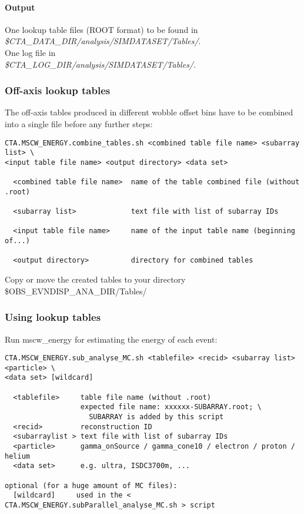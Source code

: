 \documentclass[titlepage,a4paper,twoside,11pt]{report}
\begin{document}
\paragraph{Output}

One lookup table files (ROOT format) to be found in \\
{\it \$CTA\_DATA\_DIR/analysis/SIMDATASET/Tables/}. \\
One log file in \\
{\it \$CTA\_LOG\_DIR/analysis/SIMDATASET/Tables/}.

\subsubsection{Off-axis lookup tables}

The off-axis tables produced in different wobble offset bins have to be combined into a single file before any further steps:

\begin{lstlisting}
CTA.MSCW_ENERGY.combine_tables.sh <combined table file name> <subarray list> \
<input table file name> <output directory> <data set> 

  <combined table file name>  name of the table combined file (without .root)

  <subarray list>             text file with list of subarray IDs

  <input table file name>     name of the input table name (beginning of...)

  <output directory>          directory for combined tables
\end{lstlisting}

Copy or move the created tables to your directory 
\$OBS\_EVNDISP\_ANA\_DIR/Tables/

\subsubsection{Using lookup tables}

Run mscw\_energy for estimating the energy of each
event: 

\begin{lstlisting}
CTA.MSCW_ENERGY.sub_analyse_MC.sh <tablefile> <recid> <subarray list> <particle> \
<data set> [wildcard]

  <tablefile>     table file name (without .root)
                  expected file name: xxxxxx-SUBARRAY.root; \
                    SUBARRAY is added by this script
  <recid>         reconstruction ID
  <subarraylist > text file with list of subarray IDs
  <particle>      gamma_onSource / gamma_cone10 / electron / proton / helium
  <data set>      e.g. ultra, ISDC3700m, ...

optional (for a huge amount of MC files):
  [wildcard]     used in the < CTA.MSCW_ENERGY.subParallel_analyse_MC.sh > script
\end{lstlisting}
\end{document}
